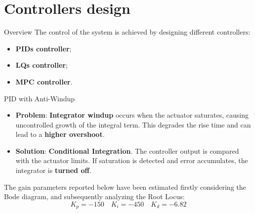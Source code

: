 \section{Controllers design}
\label{sec:controllers_design}

\begin{frame}{Overview}
    The control of the system is achieved by designing different controllers:
    \begin{itemize}
        \item \textbf{PIDs controller};
        \item \textbf{LQs controller};
        \item \textbf{MPC controller}.
    \end{itemize}
\end{frame}



\begin{frame}{PID with Anti-Windup}
    \normalsize
    \begin{itemize}
        \item \textbf{Problem}: \textbf{Integrator windup} occurs when the actuator saturates, causing uncontrolled growth of the integral term. This degrades the rise time and can lead to a \textbf{higher overshoot}.
        \item \textbf{Solution}: \textbf{Conditional Integration}. The controller output is compared with the actuator limits. If saturation is detected and error accumulates, the integrator is \textbf{turned off}.
    \end{itemize}

    The gain parameters reported below have been estimated firstly considering the Bode diagram, and subsequently analyzing the Root Locus:
    \begin{equation}
        K_p = -150 \quad K_i = -450 \quad K_d = -6.82
    \end{equation}
\end{frame}



